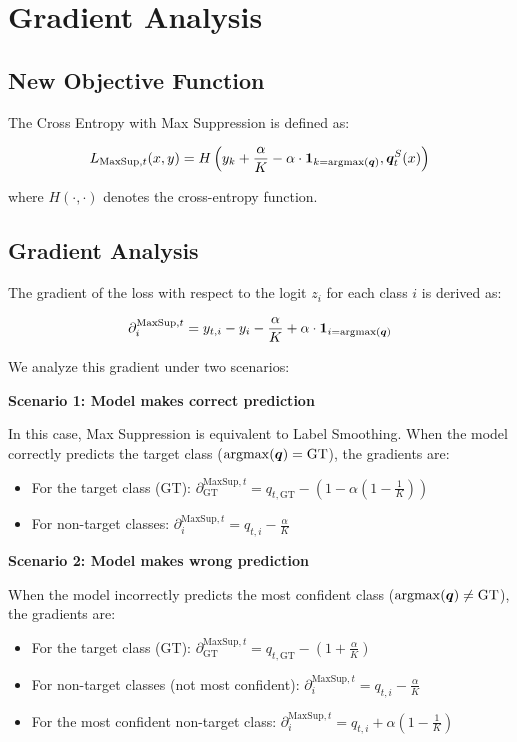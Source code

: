 \section{Gradient Analysis}
\label{app:grad}

\subsection{New Objective Function}

The Cross Entropy with Max Suppression is defined as:

\[
L_{\text{MaxSup}, t}(x, y) = H\left( y_k + \frac{\alpha}{K} - \alpha \cdot \mathbf{1}_{k = \operatorname{argmax}({\bm{q}})}, {\bm{q}}_t^S(x) \right)
\]

where $H(\cdot, \cdot)$ denotes the cross-entropy function.

\subsection{Gradient Analysis}

The gradient of the loss with respect to the logit $z_i$ for each class $i$ is derived as:

\[
\partial_i^{\text{MaxSup}, t} = y_{t,i} - y_i - \frac{\alpha}{K} + \alpha \cdot \mathbf{1}_{i = \operatorname{argmax}({\bm{q}})}
\]

We analyze this gradient under two scenarios:

\noindent\textbf{Scenario 1: Model makes correct prediction}

In this case, Max Suppression is equivalent to Label Smoothing. When the model correctly predicts the target class ($\operatorname{argmax}({\bm{q}}) = \operatorname{GT}$), the gradients are:

\begin{itemize}
\item For the target class (GT): 
      $\partial_{\text{GT}}^{\text{MaxSup}, t} = q_{t,\text{GT}} - \left(1 - \alpha \left(1 - \frac{1}{K}\right)\right)$
\item For non-target classes: 
      $\partial_i^{\text{MaxSup}, t} = q_{t,i} - \frac{\alpha}{K}$
\end{itemize}

\noindent\textbf{Scenario 2: Model makes wrong prediction}

When the model incorrectly predicts the most confident class ($\operatorname{argmax}({\bm{q}}) \neq \operatorname{GT}$), the gradients are:

\begin{itemize}
\item For the target class (GT): 
      $\partial_{\text{GT}}^{\text{MaxSup}, t} = q_{t,\text{GT}} - \left(1 + \frac{\alpha}{K}\right)$
\item For non-target classes (not most confident): 
      $\partial_i^{\text{MaxSup}, t} = q_{t,i} - \frac{\alpha}{K}$
\item For the most confident non-target class: 
      $\partial_i^{\text{MaxSup}, t} = q_{t,i} + \alpha \left(1 - \frac{1}{K}\right)$
\end{itemize}

